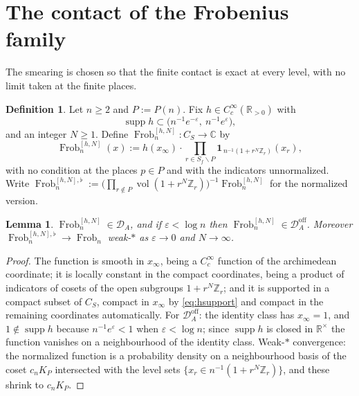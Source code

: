 \documentclass[11pt]{amsart}
\newtheorem{lemma}[theorem]{Lemma}
\theoremstyle{definition}
\newtheorem{definition}[theorem]{Definition}
\theoremstyle{remark}
\newcommand{\C}{\mathbb C}
\newcommand{\R}{\mathbb R}
\newcommand{\Z}{\mathbb Z}
\newcommand{\Frob}{\operatorname{Frob}}
\newcommand{\supp}{\operatorname{supp}}
\newcommand{\vol}{\operatorname{vol}}
\newcommand{\DA}{\mathcal D_A}
\newcommand{\Doff}{\mathcal D_A^{\mathrm{off}}}
\begin{document}
\section{The contact of the Frobenius family}\label{sec:frobcontact}

The smearing is chosen so that the finite contact is exact at every level, with
no limit taken at the finite places.

\begin{definition}\label{def:smearedfrob}
Let $n\ge2$ and $P:=P(n)$. Fix $h\in C_c^\infty(\R_{>0})$ with
\begin{equation}\label{eq:hsupport}
  \supp h\subset\bigl(n^{-1}e^{-\varepsilon},\ n^{-1}e^{\varepsilon}\bigr),
\end{equation}
and an integer $N\ge1$. Define $\Frob_n^{[h,N]}:C_S\to\C$ by
\begin{equation}\label{eq:smearedfrob}
  \Frob_n^{[h,N]}(x):=h(x_\infty)\cdot\prod_{r\in S_f\smallsetminus P}
   \mathbf 1_{\,n^{-1}(1+r^N\Z_r)}(x_r),
\end{equation}
with no condition at the places $p\in P$ and with the indicators
unnormalized. Write $\Frob_n^{[h,N],\flat}:=\bigl(\prod_{r\notin P}
\vol(1+r^N\Z_r)\bigr)^{-1}\Frob_n^{[h,N]}$ for the normalized version.
\end{definition}

\begin{lemma}\label{lem:smearedfrobinDA}
$\Frob_n^{[h,N]}\in\DA$, and if $\varepsilon<\log n$ then
$\Frob_n^{[h,N]}\in\Doff$. Moreover $\Frob_n^{[h,N],\flat}\to\Frob_n$
weak-$*$ as $\varepsilon\to0$ and $N\to\infty$.
\end{lemma}

\begin{proof}
The function is smooth in $x_\infty$, being a $C_c^\infty$ function of the
archimedean coordinate; it is locally constant in the compact coordinates,
being a product of indicators of cosets of the open subgroups $1+r^N\Z_r$; and
it is supported in a compact subset of $C_S$, compact in $x_\infty$ by
\eqref{eq:hsupport} and compact in the remaining coordinates automatically. For
$\Doff$: the identity class has $x_\infty=1$, and $1\notin\supp h$ because
$n^{-1}e^\varepsilon<1$ when $\varepsilon<\log n$; since $\supp h$ is closed in
$\R^\times$ the function vanishes on a neighbourhood of the identity class.
Weak-$*$ convergence: the normalized function is a probability density on a
neighbourhood basis of the coset $c_nK_P$ intersected with the level sets
$\{x_r\in n^{-1}(1+r^N\Z_r)\}$, and these shrink to $c_nK_P$.
\end{proof}
\end{document}
